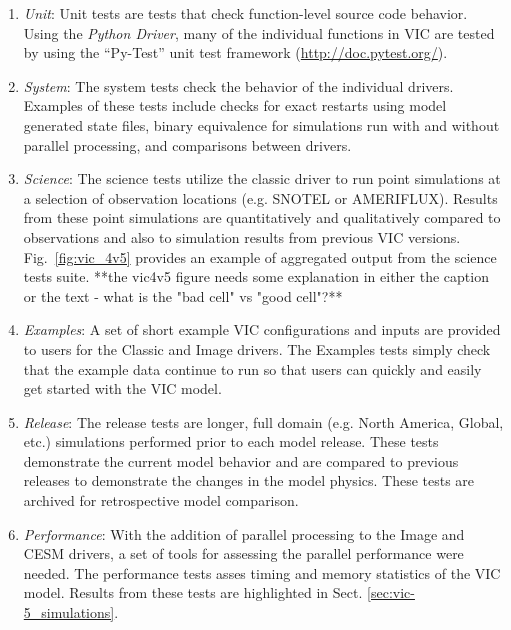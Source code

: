 \documentclass[gmd, manuscript]{copernicus}
\begin{document}
    \begin{enumerate}
      \item \textit{Unit}: Unit tests are tests that check function-level source code behavior. Using the \textit{Python Driver}, many of the individual functions in VIC are tested by using the ``Py-Test'' unit test framework (\url{http://doc.pytest.org/}).

      \item \textit{System}: The system tests check the behavior of the individual drivers. Examples of these tests include checks for exact restarts using model generated state files, binary equivalence for simulations run with and without parallel processing, and comparisons between drivers.

      \item \textit{Science}: The science tests utilize the classic driver to run point simulations at a selection of observation locations (e.g. SNOTEL or AMERIFLUX). Results from these point simulations are quantitatively and qualitatively compared to observations and also to simulation results from previous VIC versions. Fig.~\ref{fig:vic_4v5} provides an example of aggregated output from the science tests suite.  **the vic4v5 figure needs some explanation in either the caption or the text - what is the "bad cell" vs "good cell"?**

      \item \textit{Examples}: A set of short example VIC configurations and inputs are provided to users for the Classic and Image drivers. The Examples tests simply check that the example data continue to run so that users can quickly and easily get started with the VIC model.

      \item \textit{Release}: The release tests are longer, full domain (e.g. North America, Global, etc.) simulations performed prior to each model release. These tests demonstrate the current model behavior and are compared to previous releases to demonstrate the changes in the model physics. These tests are archived for retrospective model comparison.

      \item \textit{Performance}: With the addition of parallel processing to the Image and CESM drivers, a set of tools for assessing the parallel performance were needed. The performance tests asses timing and memory statistics of the VIC model. Results from these tests are highlighted in Sect. \ref{sec:vic-5_simulations}.
    \end{enumerate}
\end{document}
